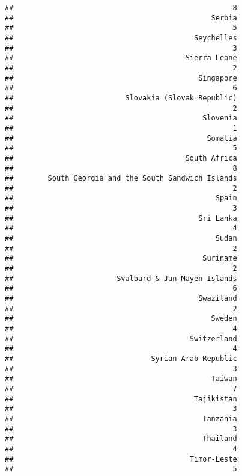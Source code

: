 \documentclass[
]{article}
\begin{document}
\begin{verbatim}
##                                                   8 
##                                              Serbia 
##                                                   5 
##                                          Seychelles 
##                                                   3 
##                                        Sierra Leone 
##                                                   2 
##                                           Singapore 
##                                                   6 
##                          Slovakia (Slovak Republic) 
##                                                   2 
##                                            Slovenia 
##                                                   1 
##                                             Somalia 
##                                                   5 
##                                        South Africa 
##                                                   8 
##        South Georgia and the South Sandwich Islands 
##                                                   2 
##                                               Spain 
##                                                   3 
##                                           Sri Lanka 
##                                                   4 
##                                               Sudan 
##                                                   2 
##                                            Suriname 
##                                                   2 
##                        Svalbard & Jan Mayen Islands 
##                                                   6 
##                                           Swaziland 
##                                                   2 
##                                              Sweden 
##                                                   4 
##                                         Switzerland 
##                                                   4 
##                                Syrian Arab Republic 
##                                                   3 
##                                              Taiwan 
##                                                   7 
##                                          Tajikistan 
##                                                   3 
##                                            Tanzania 
##                                                   3 
##                                            Thailand 
##                                                   4 
##                                         Timor-Leste 
##                                                   5 

\end{verbatim}
\end{document}
